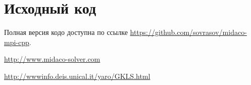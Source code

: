 \documentclass[a4paper]{article}
\begin{document}
\section{Исходный код}
\label{sec:source}
Полная версия кодо доступна по ссылке \url{https://github.com/sovrasov/midaco-mpi-cpp}.


\begin{thebibliography}{}

\url{http://www.midaco-solver.com}

\url{http://wwwinfo.deis.unical.it/yaro/GKLS.html}

\end{thebibliography}
\end{document}
